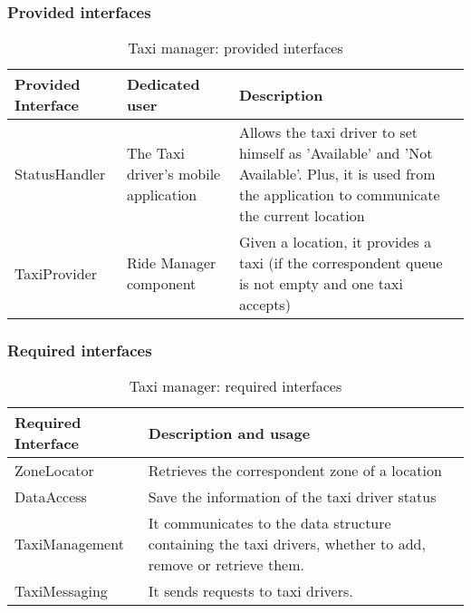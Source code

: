 \subsubsection{Provided interfaces}
\begin{table}[H]
	\begin{longtable}{| p{} | p{} | p{} |}
		\hline
		\textbf{Provided Interface} & \textbf{Dedicated user} & \textbf{Description} \\ \hline
		StatusHandler & The Taxi driver's mobile application & Allows the taxi driver to set himself as 'Available' and 'Not Available'. Plus, it is used from the application to communicate the current location \\ \hline
		TaxiProvider & Ride Manager component & Given a location, it provides a taxi (if the correspondent queue is not empty and one taxi accepts) \\ \hline
	\end{longtable}
	\caption{Taxi manager: provided interfaces}
	\label{tab:taximanager:providedInterfaces}
\end{table}
\subsubsection{Required interfaces}
\begin{table}[H]
	\begin{longtable}{| l | p{} |}
		\hline
		\textbf{Required Interface} & \textbf{Description and usage} \\ \hline
		ZoneLocator & Retrieves the correspondent zone of a location \\ \hline
		DataAccess & Save the information of the taxi driver status \\ \hline
		TaxiManagement & It communicates to the data structure containing the taxi drivers, whether to add, remove or retrieve them. \\ \hline
		TaxiMessaging & It sends requests to taxi drivers. \\ \hline
	\end{longtable}
	\caption{Taxi manager: required interfaces}
	\label{tab:taximanager:requiredInterfaces}
\end{table}
